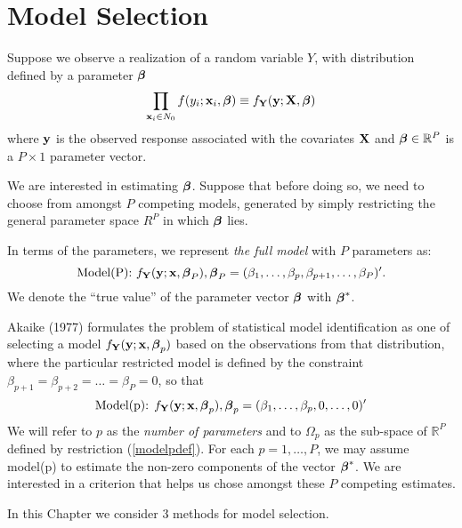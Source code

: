 \chapter{Model Selection}
Suppose we observe a realization of a random variable $Y$, with
distribution defined by a parameter $\mbox{\boldmath $\beta$\unboldmath}$
\begin{equation}
\label{gdef}
\prod_{{\mathbf x}_i \in N_0} f(y_i; {\mathbf x}_i,\mbox{\boldmath $\beta$\unboldmath}) \equiv
f_{\mathbf Y}({\mathbf y} ;{\mathbf X},\mbox{\boldmath $\beta$\unboldmath})  
\end{equation}
where ${\mathbf y}$ is the observed response associated with the
covariates ${\mathbf X}$ and 
$\mbox{\boldmath $\beta$\unboldmath} \in \mathbb{R}^P$ is a $P \times 1$ parameter vector. 

We are interested in estimating $\mbox{\boldmath $\beta$\unboldmath}$. Suppose that before
doing so, we need to choose from amongst $P$
competing models, generated by simply restricting the
general parameter space $R^P$ in which $\mbox{\boldmath $\beta$\unboldmath}$ lies.

In terms of the
parameters, we represent {\sl the full model} with $P$ parameters as:
\[
\mbox{Model(P): } f_{\mathbf Y}({\mathbf y} ;{\mathbf x},\mbox{\boldmath $\beta$\unboldmath}_P),
  \mbox{\boldmath $\beta$\unboldmath}_P = (\beta_1,\dots,\beta_p,\beta_{p+1},\dots,\beta_P)'.
\]
We denote the ``true value'' of the parameter vector $\mbox{\boldmath $\beta$\unboldmath}$ with
$\mbox{\boldmath $\beta$\unboldmath}^*$. 

Akaike (1977)
formulates the problem of statistical model identification as one of
selecting a model $f_{\mathbf Y}({\mathbf y};{\mathbf x},\mbox{\boldmath $\beta$\unboldmath}_p)$
based on the  
observations from that distribution, where the particular restricted
model is defined by the constraint $\beta_{p+1} = \beta_{p+2} = \dots
= \beta_{P} = 0$, so that 
\begin{equation}
\label{modelpdef}
\mbox{Model(p): } f_{\mathbf Y}({\mathbf y};{\mathbf x},\mbox{\boldmath $\beta$\unboldmath}_p),
\mbox{\boldmath $\beta$\unboldmath}_p =  (\beta_1,\dots,\beta_p,0,\dots,0)' 
\end{equation}
We will refer to $p$ as the {\sl number of parameters} and to
$\Omega_p$ as the sub-space of $\mathbb{R}^P$ defined by restriction
(\ref{modelpdef}). For each $p=1,\dots,P$, we may assume model(p) to
estimate the non-zero 
components of the vector $\mbox{\boldmath $\beta$\unboldmath}^*$. We are interested in a 
criterion that helps us chose amongst these $P$ competing estimates.

In this Chapter we consider 3 methods for model selection.






